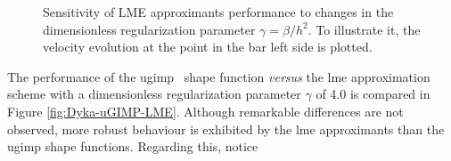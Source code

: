 \documentclass[preprint,12pt,a4paper]{elsarticle}
\begin{document}
\begin{figure}
  \centering
  \caption{Sensitivity  of LME approximants performance to changes in the
    dimensionless regularization parameter $\gamma = \beta/h^2$. To
    illustrate it, the velocity evolution at the point in the bar left side
    is plotted.}
  \label{fig:Dyka-LME-gamma}
\end{figure}
The performance of the
\acrshort{ugimp}~\cite{Bardenhagen2004} shape function \textit{versus} the \acrshort{lme} approximation scheme with
a dimensionless regularization parameter $\gamma$ of 4.0 is compared in Figure \ref{fig:Dyka-uGIMP-LME}. Although remarkable differences are not observed, more
robust behaviour is exhibited by the \acrshort{lme} approximants than the \acrshort{ugimp} shape functions. Regarding this, notice
\end{document}
